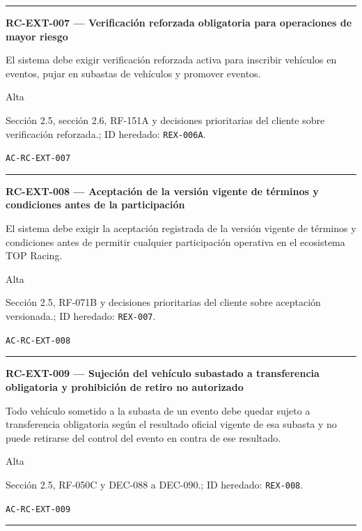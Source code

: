\documentclass[10pt,letterpaper]{article}
\begin{document}
\vspace{0.25em}\hrule\vspace{0.65em}
\noindent\textbf{RC-EXT-007 --- Verificación reforzada obligatoria para operaciones de mayor riesgo}\par
\begin{description}[style=nextline,leftmargin=3.15cm,labelwidth=2.8cm,font=\normalfont\bfseries]
\item[Obligación] El sistema debe exigir verificación reforzada activa para inscribir vehículos en eventos, pujar en subastas de vehículos y promover eventos.
\item[Prioridad] Alta
\item[Procedencia] Sección 2.5, sección 2.6, RF-151A y decisiones prioritarias del cliente sobre verificación reforzada.; ID heredado: \texttt{REX-006A}.
\item[Verificación] \texttt{AC-RC-EXT-007}
\end{description}
\vspace{0.25em}\hrule\vspace{0.65em}
\noindent\textbf{RC-EXT-008 --- Aceptación de la versión vigente de términos y condiciones antes de la participación}\par
\begin{description}[style=nextline,leftmargin=3.15cm,labelwidth=2.8cm,font=\normalfont\bfseries]
\item[Obligación] El sistema debe exigir la aceptación registrada de la versión vigente de términos y condiciones antes de permitir cualquier participación operativa en el ecosistema TOP Racing.
\item[Prioridad] Alta
\item[Procedencia] Sección 2.5, RF-071B y decisiones prioritarias del cliente sobre aceptación versionada.; ID heredado: \texttt{REX-007}.
\item[Verificación] \texttt{AC-RC-EXT-008}
\end{description}
\vspace{0.25em}\hrule\vspace{0.65em}
\noindent\textbf{RC-EXT-009 --- Sujeción del vehículo subastado a transferencia obligatoria y prohibición de retiro no autorizado}\par
\begin{description}[style=nextline,leftmargin=3.15cm,labelwidth=2.8cm,font=\normalfont\bfseries]
\item[Obligación] Todo vehículo sometido a la subasta de un evento debe quedar sujeto a transferencia obligatoria según el resultado oficial vigente de esa subasta y no puede retirarse del control del evento en contra de ese resultado.
\item[Prioridad] Alta
\item[Procedencia] Sección 2.5, RF-050C y DEC-088 a DEC-090.; ID heredado: \texttt{REX-008}.
\item[Verificación] \texttt{AC-RC-EXT-009}
\end{description}
\vspace{0.25em}\hrule\vspace{0.65em}
\end{document}
